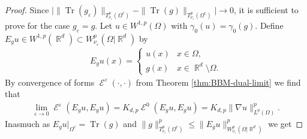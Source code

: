\documentclass[12pt, reqno]{amsart}%
\theoremstyle{plain}  %
\theoremstyle{definition}  %
\numberwithin{equation}{section}
\DeclareMathOperator{\cE}{\mathcal{E}}
\DeclareMathOperator{\R}{\mathbb{R}}
\newcommand{\eps}{\varepsilon}
\newcommand{\TnuOma}{T^p_{\nu_\eps} (\Omega^c)}
\begin{document}
\begin{proof}
Since $\big|\|\operatorname{Tr}(g_\eps)\|_{\TnuOma} -\|\operatorname{Tr}(g)\|_{\TnuOma}\big|\to 0$, it is sufficient to prove for the case $g_\eps=g$. Let $u\in W^{1,p}(\Omega)$ with  $\gamma_0(u)= \gamma_0(g)$. Define $ E_gu\in W^{1,p}(\R^d)\subset W^p_{\nu_\eps}(\Omega|\R^d)$ by
\begin{align*}
E_g u(x)=\begin{cases}
u(x)& x\in \Omega,\\
g(x)& x\in \R^d\setminus \Omega.
\end{cases}
\end{align*}
By convergence of forms $\cE^\eps(\cdot,\cdot)$ from  Theorem \ref{thm:BBM-dual-limit} we find that
\begin{align*}
\lim_{\eps\to0}\cE^\eps(E_g u, E_g u) =K_{d,p}\cE^0(E_g u, E_g u)=   K_{d,p}\|\nabla u\|^p_{L^{p}(\Omega)}.
\end{align*}
Inasmuch as $E_gu |_{\Omega^c}=  \operatorname{Tr}(g)$ and $\|g\|^p_{T^p_{\nu_\eps}(\Omega^c)}  \leq  \|E_g u\|^p_{W^p_{\nu_\eps}(\Omega|\R^d)}$ we get


\end{proof}
\end{document}
